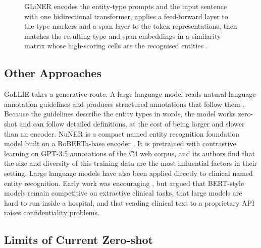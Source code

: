 \begin{figure}[t]
{}
\caption{GLiNER encodes the entity-type prompts and the input sentence with one
bidirectional transformer, applies a feed-forward layer to the type markers and a span
layer to the token representations, then matches the resulting type and span embeddings in
a similarity matrix whose high-scoring cells are the recognised entities
\citep{zaratiana2024gliner}.}
\label{fig:ie-gliner}
\end{figure}

\subsection{Other Approaches}

GoLLIE takes a generative route. A large language model reads natural-language annotation
guidelines and produces structured annotations that follow them \citep{sainz2024gollie}.
Because the guidelines describe the entity types in words, the model works zero-shot and can
follow detailed definitions, at the cost of being larger and slower than an encoder. NuNER is
a compact named entity recognition foundation model built on a RoBERTa-base encoder
\citep{bogdanov2024nuner}. It is pretrained with contrastive learning on GPT-3.5 annotations of
the C4 web corpus, and its authors find that the size and diversity of this training data
are the most influential factors in their setting. Large language models have also been applied directly to
clinical named entity recognition. Early work was encouraging \citep{agrawal_large_2022},
but \citet{lehman_we_2023} argued that BERT-style models remain
competitive on extractive clinical tasks, that large models are hard to run inside a hospital,
and that sending clinical text to a proprietary API raises confidentiality problems.

\subsection{Limits of Current Zero-shot}

